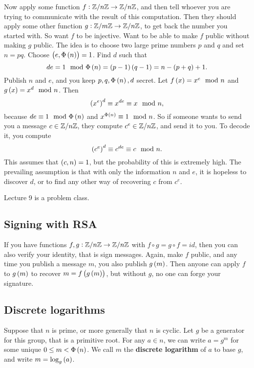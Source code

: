Now apply some function $ f : \mathbb{Z} / n\mathbb{Z} \to \mathbb{Z} / n\mathbb{Z} $, and then tell whoever you are trying to communicate with the result of this computation. Then they should apply some other function $ g : \mathbb{Z} / m\mathbb{Z} \to \mathbb{Z} / n\mathbb{Z} $, to get back the number you started with. So want $ f $ to be injective. Want to be able to make $ f $ public without making $ g $ public. The idea is to choose two large prime numbers $ p $ and $ q $ and set $ n = pq $. Choose $ \br{e, \Phi\br{n}} = 1 $. Find $ d $ such that
$$ de = 1 \mod \Phi\br{n} = \br{p - 1}\br{q - 1} = n - \br{p + q} + 1. $$
Publish $ n $ and $ e $, and you keep $ p, q, \Phi\br{n}, d $ secret. Let $ f\br{x} = x^e \mod n $ and $ g\br{x} = x^d \mod n $. Then
$$ \br{x^e}^d \equiv x^{de} \equiv x \mod n, $$
because $ de \equiv 1 \mod \Phi\br{n} $ and $ x^{\Phi\br{n}} \equiv 1 \mod n $. So if someone wants to send you a message $ c \in \mathbb{Z} / n\mathbb{Z} $, they compute $ c^e \in \mathbb{Z} / n\mathbb{Z} $, and send it to you. To decode it, you compute
$$ \br{c^e}^d \equiv c^{de} \equiv c \mod n. $$
This assumes that $ \br{c, n} = 1 $, but the probability of this is extremely high. The prevailing assumption is that with only the information $ n $ and $ e $, it is hopeless to discover $ d $, or to find any other way of recovering $ c $ from $ c^e $.


Lecture 9 is a problem class.


\subsection{Signing with RSA}

If you have functions $ f, g : \mathbb{Z} / n\mathbb{Z} \to \mathbb{Z} / n\mathbb{Z} $ with $ f \circ g = g \circ f = id $, then you can also verify your identity, that is sign messages. Again, make $ f $ public, and any time you publish a message $ m $, you also publish $ g\br{m} $. Then anyone can apply $ f $ to $ g\br{m} $ to recover $ m = f\br{g\br{m}} $, but without $ g $, no one can forge your signature.

\subsection{Discrete logarithms}

Suppose that $ n $ is prime, or more generally that $ \unit{n} $ is cyclic. Let $ g $ be a generator for this group, that is a primitive root. For any $ a \in \unit{n} $, we can write $ a = g^m $ for some unique $ 0 \le m < \Phi\br{n} $. We call $ m $ the \textbf{discrete logarithm} of $ a $ to base $ g $, and write $ m = \log_g\br{a} $.

